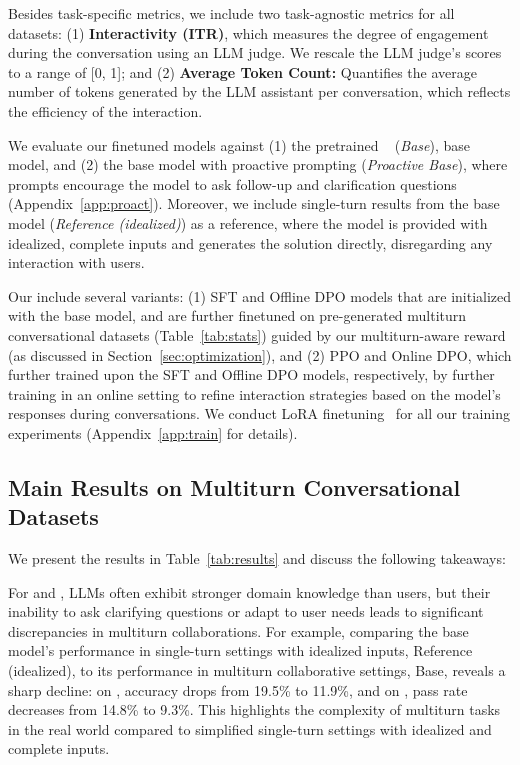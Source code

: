 Besides task-specific metrics, we include two task-agnostic metrics for all datasets: (1) \textbf{{Interactivity (ITR)}}, which measures the degree of engagement during the conversation using an LLM judge. We rescale the LLM judge's scores to a range of [0, 1]; and (2) \textbf{{Average Token Count}:} Quantifies the average number of tokens generated by the LLM assistant per conversation, which reflects the efficiency of the interaction.




 We evaluate our finetuned models against (1) the pretrained \llama~\citep{metallama} (\textit{Base}), \ie base model, and (2) the base model with proactive prompting (\textit{Proactive Base}), where prompts encourage the model to ask follow-up and clarification questions (\cf Appendix~\ref{app:proact}). Moreover, we include single-turn results from the base model (\ie \textit{Reference (idealized)}) as a reference, where the model is provided with idealized, complete inputs and generates the solution directly, disregarding any interaction with users. 

 Our \objects include several variants: (1) SFT and Offline DPO models that are initialized with the \llama base model, and are further finetuned on pre-generated multiturn conversational datasets (Table~\ref{tab:stats}) guided by our multiturn-aware reward (as discussed in Section~\ref{sec:optimization}), and (2) PPO and Online DPO, which further trained upon the SFT and Offline DPO models, respectively, by further training in an online setting to refine interaction strategies based on the model's responses during conversations. We conduct LoRA finetuning~\citep{lora} for all our training experiments (\cf Appendix~\ref{app:train} for details).

\subsection{Main Results on Multiturn Conversational Datasets}
\label{sec:quantitative}

We present the results in Table~\ref{tab:results} and discuss the following takeaways:


For \mathct and \codet, LLMs often exhibit stronger domain knowledge than users, but their inability to ask clarifying questions or adapt to user needs leads to significant discrepancies in multiturn collaborations. For example, comparing the base model's performance in single-turn settings with idealized inputs, \ie Reference (idealized), to its performance in multiturn collaborative settings, \ie Base, reveals a sharp decline: on \mathct, accuracy drops from 19.5\% to 11.9\%, and on \codet, pass rate decreases from 14.8\% to 9.3\%.
This highlights the complexity of multiturn tasks in the real world compared to simplified single-turn settings with idealized and complete inputs.

